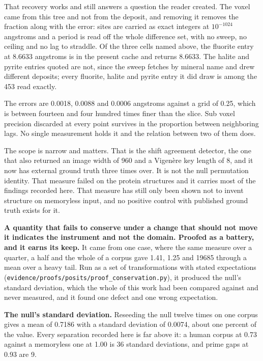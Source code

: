 That recovery works and still answers a question the reader created. The voxel came from this tree and not from the deposit, and removing it removes the fraction along with the error: sites are carried as exact integers at \(10^{-1024}\) angstroms and a period is read off the whole difference set, with no sweep, no ceiling and no lag to straddle. Of the three cells named above, the fluorite entry at 8.6633 angstroms is in the present cache and returns 8.6633. The halite and pyrite entries quoted are not, since the sweep fetches by mineral name and drew different deposits; every fluorite, halite and pyrite entry it did draw is among the 453 read exactly.

The errors are 0.0018, 0.0088 and 0.0006 angstroms against a grid of 0.25, which is between fourteen and four hundred times finer than the slice. Sub voxel precision discarded at every point survives in the proportion between neighboring lags. No single measurement holds it and the relation between two of them does.

The scope is narrow and matters. That is the shift agreement detector, the one that also returned an image width of 960 and a Vigenère key length of 8, and it now has external ground truth three times over. It is not the null permutation identity. That measure failed on the protein structures and it carries most of the findings recorded here. That measure has still only been shown not to invent structure on memoryless input, and no positive control with published ground truth exists for it.

\textbf{A quantity that fails to conserve under a change that should not move it indicates the instrument and not the domain. Proofed as a battery, and it earns its keep.} It came from one case, where the same measure over a quarter, a half and the whole of a corpus gave 1.41, 1.25 and 19685 through a mean over a heavy tail. Run as a set of transformations with stated expectations (\texttt{evidence/\allowbreak{}proofs/\allowbreak{}posits/\allowbreak{}proof\_\allowbreak{}conservation.\allowbreak{}py}), it produced the null's standard deviation, which the whole of this work had been compared against and never measured, and it found one defect and one wrong expectation.

\textbf{The null's standard deviation.} Reseeding the null twelve times on one corpus gives a mean of 0.7186 with a standard deviation of 0.0074, about one percent of the value. Every separation recorded here is far above it: a human corpus at 0.73 against a memoryless one at 1.00 is 36 standard deviations, and prime gaps at 0.93 are 9.


